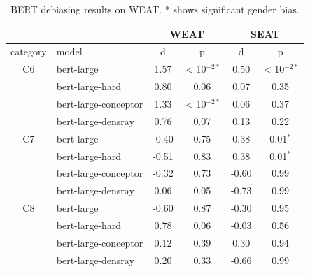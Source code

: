 \begin{table}[h]
	\centering
	\footnotesize
	\begin{tabular}{clcccc}
		\hline
		&&\multicolumn{2}{c}{WEAT}&\multicolumn{2}{c}{SEAT}\\
		\hline
		category & model & d & p& d & p\\
		\hline
		C6 & bert-large & 1.57 & $<$10$^{-2*}$ &0.50&$<$10$^{-2*}$\\
		& bert-large-hard & 0.80 & 0.06&0.07&0.35\\
		& bert-large-conceptor & 1.33 & $<$10$^{-2*}$&{0.06}&0.37\\
		&bert-large-densray & {0.76} & 0.07&0.13&0.22\\
		\hline
		C7 & bert-large & -0.40 & 0.75 &0.38&0.01$^{*}$\\
		& bert-large-hard & -0.51 & 0.83&0.38&0.01$^{*}$\\
		& bert-large-conceptor & -0.32 & 0.73&{-0.60}&0.99\\
		& bert-large-densray & {0.06} & 0.05&-0.73&0.99\\
		\hline
		C8& bert-large & -0.60 & 0.87 &-0.30&0.95\\
		& bert-large-hard & 0.78 & 0.06&{-0.03}&0.56\\
		& bert-large-conceptor & {0.12} & 0.39&0.30&0.94\\
		& bert-large-densray & 0.20 & 0.33&-0.66&0.99\\
		\hline
	\end{tabular}
	\caption{
		BERT debiasing results on WEAT. * shows significant gender bias.}
\end{table}

